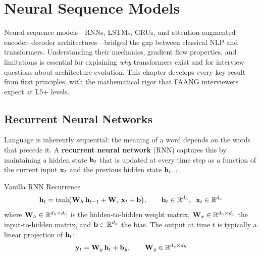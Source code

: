 
\chapter{Neural Sequence Models}
\label{chap:neural_sequence}

\begin{tldr}
Neural sequence models---RNNs, LSTMs, GRUs, and attention-augmented
encoder--decoder architectures---bridged the gap between classical NLP and
transformers.  Understanding their mechanics, gradient flow properties, and
limitations is essential for explaining \emph{why} transformers exist and for
interview questions about architecture evolution.  This chapter develops every
key result from first principles, with the mathematical rigor that FAANG
interviewers expect at L5+ levels.
\end{tldr}

\section{Recurrent Neural Networks}
\label{sec:rnn}

Language is inherently sequential: the meaning of a word depends on the words
that precede it.  A \textbf{recurrent neural network} (RNN) captures this by
maintaining a hidden state $\mathbf{h}_t$ that is updated at every time step as a
function of the current input $\mathbf{x}_t$ and the previous hidden state
$\mathbf{h}_{t-1}$.

\begin{mathresult}{Vanilla RNN Recurrence}
\begin{equation}
\mathbf{h}_t = \tanh\!\bigl(\mathbf{W}_h \,\mathbf{h}_{t-1} + \mathbf{W}_x \,\mathbf{x}_t + \mathbf{b}\bigr),
\qquad \mathbf{h}_t \in \mathbb{R}^{d_h},\;\; \mathbf{x}_t \in \mathbb{R}^{d_x}
\label{eq:rnn}
\end{equation}
where $\mathbf{W}_h \in \mathbb{R}^{d_h \times d_h}$ is the hidden-to-hidden weight matrix,
$\mathbf{W}_x \in \mathbb{R}^{d_h \times d_x}$ the input-to-hidden matrix, and
$\mathbf{b} \in \mathbb{R}^{d_h}$ the bias.  The output at time $t$ is typically a linear
projection of $\mathbf{h}_t$:
\begin{equation}
\mathbf{y}_t = \mathbf{W}_y \,\mathbf{h}_t + \mathbf{b}_y, \qquad \mathbf{W}_y \in \mathbb{R}^{d_y \times d_h}
\end{equation}
\end{mathresult}

